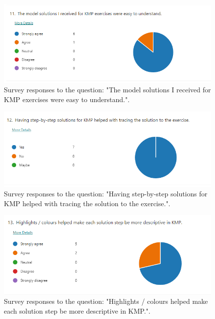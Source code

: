 \documentclass{l4proj}
\begin{document}
\begin{appendices}
\begin{figure}[h]
    \centering
    \includegraphics[width=0.9\linewidth]{images/k_model_solution.png}    

    \caption{Survey responses to the question: "The model solutions I received for KMP exercises were easy to understand.".}
    \label{fig:k_model_solution} 
\end{figure}

\begin{figure}[h]
    \centering
    \includegraphics[width=0.9\linewidth]{images/k_step_by_step.png}    

    \caption{Survey responses to the question: "Having step-by-step solutions for KMP helped with tracing the solution to the exercise.".}
    \label{fig:k_step_by_step} 
\end{figure}

\begin{figure}[h]
    \centering
    \includegraphics[width=0.9\linewidth]{images/k_highlights.png}    

    \caption{Survey responses to the question: "Highlights / colours helped make each solution step be more descriptive in KMP.".}
    \label{fig:k_highlights} 
\end{figure}


\end{appendices}
\end{document}
